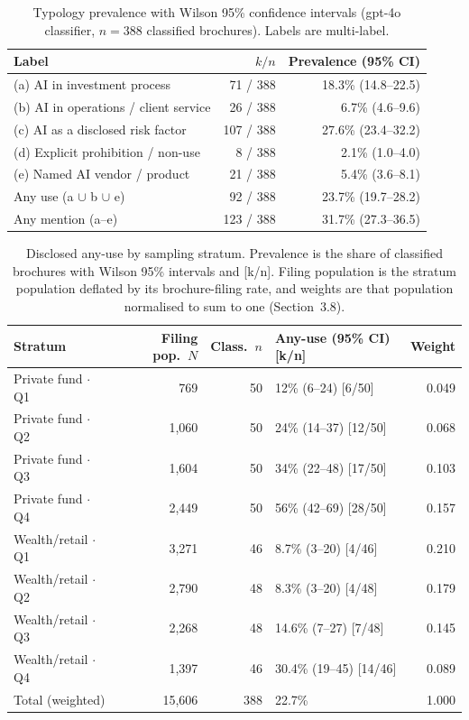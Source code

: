 \documentclass[utf8]{FrontiersinHarvard}
\begin{document}

\begin{table}[h!]
\caption{Typology prevalence with Wilson 95\% confidence intervals (gpt-4o classifier, $n = 388$ classified brochures). Labels are multi-label.}
\label{tab:typology}
\centering
\begin{tabular}{lrr}
\toprule
Label & $k / n$ & Prevalence (95\% CI) \\
\midrule
(a) AI in investment process & 71 / 388 & 18.3\% (14.8--22.5) \\
(b) AI in operations / client service & 26 / 388 & 6.7\% (4.6--9.6) \\
(c) AI as a disclosed risk factor & 107 / 388 & 27.6\% (23.4--32.2) \\
(d) Explicit prohibition / non-use & 8 / 388 & 2.1\% (1.0--4.0) \\
(e) Named AI vendor / product & 21 / 388 & 5.4\% (3.6--8.1) \\
Any use (a $\cup$ b $\cup$ e) & 92 / 388 & 23.7\% (19.7--28.2) \\
Any mention (a--e) & 123 / 388 & 31.7\% (27.3--36.5) \\
\bottomrule
\end{tabular}
\end{table}

\begin{table}[h!]
\caption{Disclosed any-use by sampling stratum. Prevalence is the share of classified brochures with Wilson 95\% intervals and [k/n]. Filing population is the stratum population deflated by its brochure-filing rate, and weights are that population normalised to sum to one (Section~3.8).}
\label{tab:gradient}
\centering
\small
\begin{tabular}{lrrlr}
\toprule
Stratum & Filing pop.\ $N$ & Class.\ $n$ & Any-use (95\% CI) [k/n] & Weight \\
\midrule
Private fund $\cdot$ Q1 & 769 & 50 & 12\% (6--24) [6/50] & 0.049 \\
Private fund $\cdot$ Q2 & 1{,}060 & 50 & 24\% (14--37) [12/50] & 0.068 \\
Private fund $\cdot$ Q3 & 1{,}604 & 50 & 34\% (22--48) [17/50] & 0.103 \\
Private fund $\cdot$ Q4 & 2{,}449 & 50 & 56\% (42--69) [28/50] & 0.157 \\
Wealth/retail $\cdot$ Q1 & 3{,}271 & 46 & 8.7\% (3--20) [4/46] & 0.210 \\
Wealth/retail $\cdot$ Q2 & 2{,}790 & 48 & 8.3\% (3--20) [4/48] & 0.179 \\
Wealth/retail $\cdot$ Q3 & 2{,}268 & 48 & 14.6\% (7--27) [7/48] & 0.145 \\
Wealth/retail $\cdot$ Q4 & 1{,}397 & 46 & 30.4\% (19--45) [14/46] & 0.089 \\
\midrule
Total (weighted) & 15{,}606 & 388 & 22.7\% & 1.000 \\
\bottomrule
\end{tabular}
\end{table}
\end{document}
